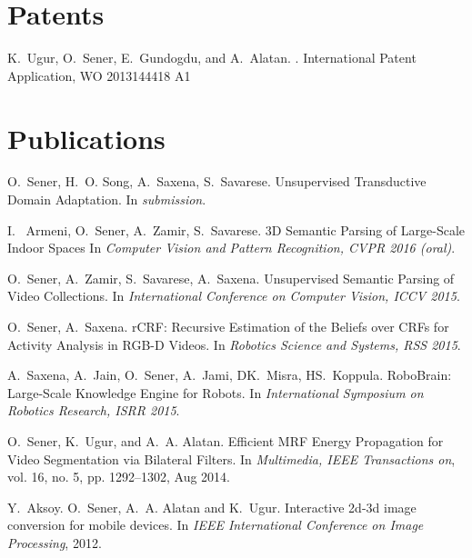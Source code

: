 \documentclass[margin,line,10pt]{resume}
\begin{document}
\begin{resume}


    \section{\mysidestyle \textcolor{olgray}{Patents}}
	K.~Ugur, O.~Sener, E.~Gundogdu, and A.~Alatan.
	.
	\newblock International Patent Application, WO 2013144418 A1
	\vspace{-2mm}

\newpage

\section{\mysidestyle \textcolor{olgray}{Publications}}

O.~Sener, H.~O. Song, A.~Saxena, S.~Savarese.
\newblock Unsupervised Transductive Domain Adaptation. 
\newblock In {\em submission}.
\vspace{-2mm}

I. ~Armeni, O.~Sener, A.~Zamir, S.~Savarese.
\newblock 3D Semantic Parsing of Large-Scale Indoor Spaces
\newblock In {\em Computer Vision and Pattern Recognition, CVPR 2016 (oral)}.
\vspace{-2mm}

O.~Sener, A.~Zamir, S.~Savarese, A.~Saxena.
\newblock Unsupervised Semantic Parsing of Video Collections.
\newblock In {\em International Conference on Computer Vision, ICCV 2015}.
\vspace{-2mm}

O.~Sener, A.~Saxena.
\newblock rCRF: Recursive Estimation of the Beliefs over CRFs for Activity Analysis in RGB-D Videos.
\newblock In {\em Robotics Science and Systems, RSS 2015}.
\vspace{-2mm}

A.~Saxena, A.~Jain, O.~Sener, A.~Jami, DK.~Misra, HS.~Koppula.
\newblock RoboBrain: Large-Scale Knowledge Engine for Robots.
\newblock In {\em International Symposium on Robotics Research, ISRR 2015}.
\vspace{-2mm}

O.~Sener, K.~Ugur, and A.~A. Alatan.
\newblock Efficient MRF Energy Propagation for Video Segmentation via Bilateral Filters.
\newblock In {\em Multimedia, IEEE Transactions on}, vol. 16, no. 5, pp. 1292–1302, Aug 2014.


Y.~Aksoy. O.~Sener, A.~A. Alatan and K.~Ugur.
\newblock Interactive 2d-3d image conversion for mobile devices.
\newblock In {\em IEEE International Conference on Image Processing}, 2012.
\vspace{-2mm}


\end{resume}
\end{document}
